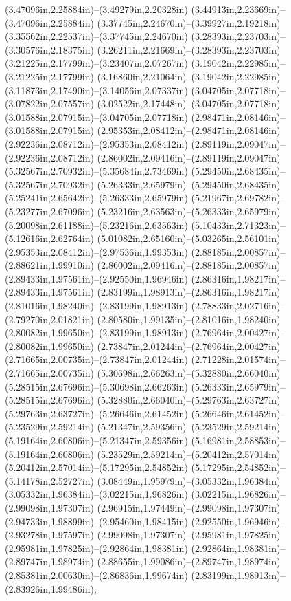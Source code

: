 (3.47096in,2.25884in)--(3.49279in,2.20328in) (3.44913in,2.23669in)--(3.47096in,2.25884in) (3.37745in,2.24670in)--(3.39927in,2.19218in) (3.35562in,2.22537in)--(3.37745in,2.24670in) (3.28393in,2.23703in)--(3.30576in,2.18375in) (3.26211in,2.21669in)--(3.28393in,2.23703in) (3.21225in,2.17799in)--(3.23407in,2.07267in) (3.19042in,2.22985in)--(3.21225in,2.17799in) (3.16860in,2.21064in)--(3.19042in,2.22985in) (3.11873in,2.17490in)--(3.14056in,2.07337in) (3.04705in,2.07718in)--(3.07822in,2.07557in) (3.02522in,2.17448in)--(3.04705in,2.07718in) (3.01588in,2.07915in)--(3.04705in,2.07718in) (2.98471in,2.08146in)--(3.01588in,2.07915in) (2.95353in,2.08412in)--(2.98471in,2.08146in) (2.92236in,2.08712in)--(2.95353in,2.08412in) (2.89119in,2.09047in)--(2.92236in,2.08712in) (2.86002in,2.09416in)--(2.89119in,2.09047in) (5.32567in,2.70932in)--(5.35684in,2.73469in) (5.29450in,2.68435in)--(5.32567in,2.70932in) (5.26333in,2.65979in)--(5.29450in,2.68435in) (5.25241in,2.65642in)--(5.26333in,2.65979in) (5.21967in,2.69782in)--(5.23277in,2.67096in) (5.23216in,2.63563in)--(5.26333in,2.65979in) (5.20098in,2.61188in)--(5.23216in,2.63563in) (5.10433in,2.71323in)--(5.12616in,2.62764in) (5.01082in,2.65160in)--(5.03265in,2.56101in) (2.95353in,2.08412in)--(2.97536in,1.99353in) (2.88185in,2.00857in)--(2.88621in,1.99910in) (2.86002in,2.09416in)--(2.88185in,2.00857in) (2.89433in,1.97561in)--(2.92550in,1.96946in) (2.86316in,1.98217in)--(2.89433in,1.97561in) (2.83199in,1.98913in)--(2.86316in,1.98217in) (2.81016in,1.98240in)--(2.83199in,1.98913in) (2.78833in,2.02716in)--(2.79270in,2.01821in) (2.80580in,1.99135in)--(2.81016in,1.98240in) (2.80082in,1.99650in)--(2.83199in,1.98913in) (2.76964in,2.00427in)--(2.80082in,1.99650in) (2.73847in,2.01244in)--(2.76964in,2.00427in) (2.71665in,2.00735in)--(2.73847in,2.01244in) (2.71228in,2.01574in)--(2.71665in,2.00735in) (5.30698in,2.66263in)--(5.32880in,2.66040in) (5.28515in,2.67696in)--(5.30698in,2.66263in) (5.26333in,2.65979in)--(5.28515in,2.67696in) (5.32880in,2.66040in)--(5.29763in,2.63727in) (5.29763in,2.63727in)--(5.26646in,2.61452in) (5.26646in,2.61452in)--(5.23529in,2.59214in) (5.21347in,2.59356in)--(5.23529in,2.59214in) (5.19164in,2.60806in)--(5.21347in,2.59356in) (5.16981in,2.58853in)--(5.19164in,2.60806in) (5.23529in,2.59214in)--(5.20412in,2.57014in) (5.20412in,2.57014in)--(5.17295in,2.54852in) (5.17295in,2.54852in)--(5.14178in,2.52727in) (3.08449in,1.95979in)--(3.05332in,1.96384in) (3.05332in,1.96384in)--(3.02215in,1.96826in) (3.02215in,1.96826in)--(2.99098in,1.97307in) (2.96915in,1.97449in)--(2.99098in,1.97307in) (2.94733in,1.98899in)--(2.95460in,1.98415in) (2.92550in,1.96946in)--(2.93278in,1.97597in) (2.99098in,1.97307in)--(2.95981in,1.97825in) (2.95981in,1.97825in)--(2.92864in,1.98381in) (2.92864in,1.98381in)--(2.89747in,1.98974in) (2.88655in,1.99086in)--(2.89747in,1.98974in) (2.85381in,2.00630in)--(2.86836in,1.99674in) (2.83199in,1.98913in)--(2.83926in,1.99486in);
